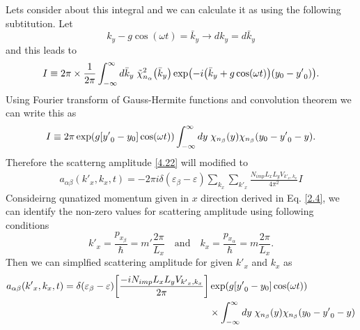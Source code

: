 \noindent
Lets consider about this integral and we can calculate it as using the following subtitution. Let
\begin{equation} \label{4.39}
  {k}_y -g\cos(\omega t) = \bar{k}_y \longrightarrow d{k}_y = d\bar{k}_y
\end{equation}
and this leads to
\begin{equation} \label{4.40}
    I \equiv
    2\pi \times \frac{1}{2\pi}
    \int_{-\infty}^{\infty} d\bar{k}_y \;
    \tilde{\chi}_{n_{\alpha}}^2 \qty(\bar{k}_y)
    \exp(
      -i\qty(\bar{k}_y + g\cos(\omega t)) \qty(y_0 - {y'}_0)
    ).
\end{equation}
Using Fourier transform of Gauss-Hermite functions and convolution theorem we can write this as
\begin{equation} \label{4.41}
    I \equiv
    {2\pi}
    \exp(g[{y'}_0 - y_0]\cos(\omega t))
    \int_{-\infty}^{\infty} dy \;
    {\chi}_{n_{\beta}}\qty(y)
    {\chi}_{n_{\beta}}\qty(y_0 - {y'}_0 - y).
\end{equation}
Therefore the scatterng amplitude \eqref{4.22} will modified to
\begin{equation} \label{4.42}
  \begin{aligned}
    a_{\alpha\beta}({k'}_x,k_x,t)  =
    -2\pi i
    \delta(\varepsilon_{\beta} - \varepsilon)
    \sum_{k_x}\sum_{{k'}_x}
    \frac{N_{imp} L_xL_y V_{{k'}_x,k_x}}{4\pi^2} I
  \end{aligned}
\end{equation}
Consideirng qunatized momentum given in $x$ direction derived in Eq. \eqref{2.4}, we can identify the non-zero values for scattering amplitude using following conditions
\begin{equation} \label{4.43}
    {k'}_x = \frac{p_{x_{\beta}}}{\hbar} = m' \frac{2\pi}{L_x}
    \quad \text{and} \quad
    k_x = \frac{p_{x_{\alpha}}}{\hbar} = m \frac{2\pi}{L_x}.
\end{equation}
Then we can simplfied scattering amplitude for given ${k'}_x$ and $k_x$ as
\begin{equation} \label{4.44}
  \begin{aligned}
    a_{\alpha\beta}({k'}_x,k_x,t)  =
    \delta(\varepsilon_{\beta} - \varepsilon)
    \qty[\frac{-i N_{imp} L_xL_y V_{{k'}_x,k_x}}{2\pi}]&
    \exp(g[{y'}_0 - y_0]\cos(\omega t)) \\
    & \times
    \int_{-\infty}^{\infty} dy \;
    {\chi}_{n_{\beta}}\qty(y)
    {\chi}_{n_{\beta}}\qty(y_0 - {y'}_0 - y)
  \end{aligned}
\end{equation}
